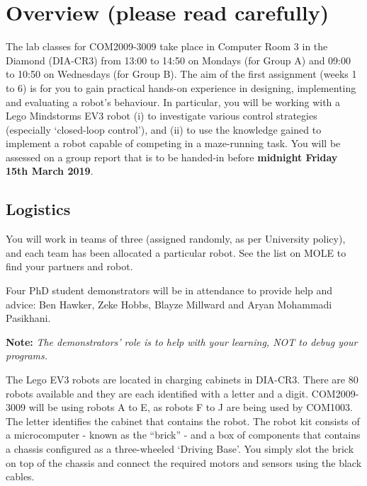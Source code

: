 \documentclass[hidelinks,a4paper,11pt]{article}
\begin{document}

\section{Overview (please read carefully)}

The lab classes for COM2009-3009 take place in Computer Room 3 in the Diamond (DIA-CR3) from 13:00 to 14:50 on Mondays (for Group A) and 09:00 to 10:50 on Wednesdays (for Group B).  The aim of the first assignment (weeks 1 to 6) is for you to gain practical hands-on experience in designing, implementing and evaluating a robot's behaviour.  In particular, you will be working with a Lego Mindstorms EV3 robot (i) to investigate various control strategies (especially `closed-loop control'), and (ii) to use the knowledge gained to implement a robot capable of competing in a maze-running task.  You will be assessed on a group report that is to be handed-in before {\color {red} \textbf{midnight Friday 15th March 2019}}.


\subsection{Logistics}

You will work in teams of three (assigned randomly, as per University policy), and each team has been allocated a particular robot.  See the list on MOLE to find your partners and robot.

Four PhD student demonstrators will be in attendance to provide help and advice: Ben Hawker, Zeke Hobbs, Blayze Millward and Aryan Mohammadi Pasikhani.

{\bfseries Note:}  \emph{The demonstrators' role is to help with your learning, NOT to debug your programs.}

The Lego EV3 robots are located in charging cabinets in DIA-CR3.  There are 80 robots available and they are each identified with a letter and a digit.  COM2009-3009 will be using robots A to E, as robots F to J are being used by COM1003.  The letter identifies the cabinet that contains the robot.  The robot kit consists of a microcomputer - known as the ``brick'' - and a box of components that contains a chassis configured as a three-wheeled `Driving Base'.  You simply slot the brick on top of the chassis and connect the required motors and sensors using the black cables.
\end{document}
